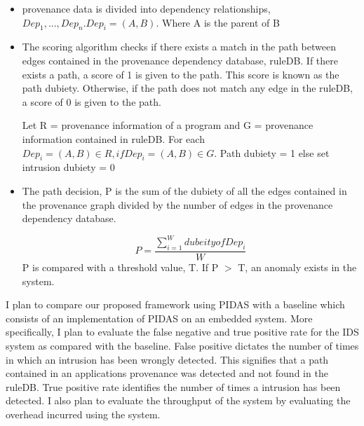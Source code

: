 \begin{itemize}

\item provenance data is divided into dependency relationships, $Dep_1,...,Dep_n. Dep_i =(A, B)$. Where A is the parent of B

\item The scoring algorithm checks if there exists a match in the path between edges contained in the provenance dependency database, ruleDB. If there exists a path, a score of 1 is given to the path. This score is known as the path dubiety. Otherwise, if the path does not match any edge in the ruleDB, a score of 0 is given to the path.

Let R = provenance information of a program and G = provenance information contained in ruleDB. For each $Dep_i = (A, B) \in R, if Dep_i = (A, B) \in G$. Path dubiety = 1 else set intrusion dubiety = 0

\item The path decision, P is the sum of the dubiety of all the edges contained in the provenance graph divided by the number of edges in the provenance dependency database.

 \[P =\frac{\sum\limits_{i=1}^W dubeity of Dep_i }{W} \] P is compared with a threshold value, T. If P $>$ T, an anomaly exists in the system.

\end{itemize}

I plan to compare our proposed framework using PIDAS with a baseline which consists of an implementation of PIDAS on an embedded system. More specifically, I plan to evaluate the false negative and true positive rate for the IDS system as compared with the baseline. False positive dictates the number of times in which an intrusion has been wrongly detected. This signifies that a path contained in an applications provenance was detected and not found in the ruleDB. True positive rate identifies the number of times a intrusion has been detected. I also plan to evaluate the throughput of the system by evaluating the overhead incurred using the system.



%
